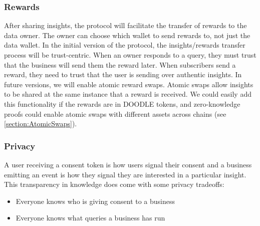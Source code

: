 \subsubsection{Rewards}
After sharing insights, the protocol will facilitate the transfer of rewards to the data owner. The owner can choose which wallet to send rewards to, not just the data wallet. In the initial version of the protocol, the insights/rewards transfer process will be trust-centric. When an owner responds to a query, they must trust that the business will send them the reward later. When subscribers send a reward, they need to trust that the user is sending over authentic insights. In future versions, we will enable atomic reward swaps. Atomic swaps allow insights to be shared at the same instance that a reward is received. We could easily add this functionality if the rewards are in DOODLE tokens, and zero-knowledge proofs could enable atomic swaps with different assets across chains (see \ref{section:AtomicSwaps}).

\subsubsection{Privacy}
A user receiving a consent token is how users signal their consent and a business emitting an event is how they signal they are interested in a particular insight. This transparency in knowledge does come with some privacy tradeoffs:
\begin{itemize}
  \item Everyone knows who is giving consent to a business
  \item Everyone knows what queries a business has run
\end{itemize}

